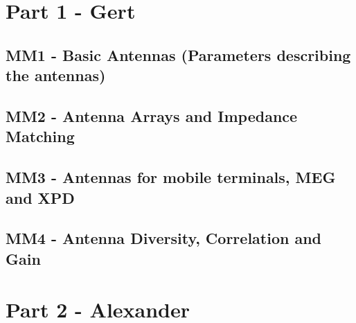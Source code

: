 



    \singlespacing
    \pagestyle{empty}	
	
	\cleardoublepage
	
	\pagestyle{plain}
		
	\tableofcontents 
	\onehalfspacing
	\pagestyle{fancy} %
    \setcounter{page}{0} %

\part{Part 1 - Gert}

\chapter{MM1 - Basic Antennas (Parameters describing the antennas)}





\chapter{MM2 - Antenna Arrays and Impedance Matching}



\chapter{MM3 - Antennas for mobile terminals, MEG and XPD}






\chapter{MM4 - Antenna Diversity, Correlation and Gain}





\part{Part 2 - Alexander}

